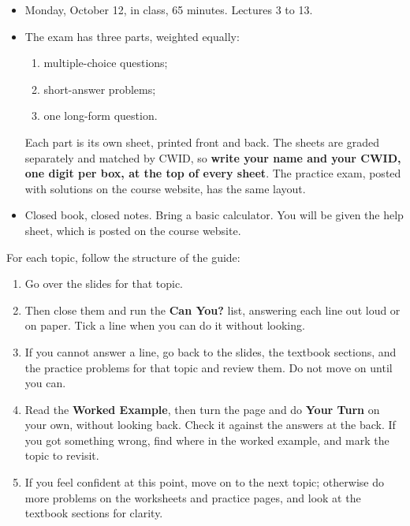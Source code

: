 \documentclass[11pt]{article}
\newcommand{\block}[1]{\needspace{4\baselineskip}\par\vspace{6pt}\noindent{\fontsize{13}{16}\selectfont\bfseries\color{accent}#1}\par\vspace{-5pt}\noindent{\color{accent}\rule{\linewidth}{0.4pt}}\par\vspace{1pt}}
\newcommand{\kw}[1]{\textbf{\textcolor{accent}{#1}}}
\begin{document}

\block{Exam Logistics}
\begin{itemize}\setlength{\itemsep}{6pt}
\item Monday, October 12, in class, 65 minutes. Lectures 3 to 13.
\item The exam has three parts, weighted equally:
\par\vspace{4pt}
\begin{enumerate}\setlength{\itemsep}{2pt}
\item multiple-choice questions;
\item short-answer problems;
\item one long-form question.
\end{enumerate}
\vspace{5pt}Each part is its own sheet, printed front and back. The sheets are graded separately and matched by CWID, so \textbf{write your name and your CWID, one digit per box, at the top of every sheet}. The practice exam, posted with solutions on the course website, has the same layout.
\item Closed book, closed notes. Bring a basic calculator. You will be given the help sheet, which is posted on the course website.
\end{itemize}

\block{How to Prepare?}
For each topic, follow the structure of the guide:
\begin{enumerate}\setlength{\itemsep}{6pt}
\item Go over the slides for that topic.
\item Then close them and run the \kw{Can You?} list, answering each line out loud or on paper. Tick a line when you can do it without looking.
\item If you cannot answer a line, go back to the slides, the textbook sections, and the practice problems for that topic and review them. Do not move on until you can.
\item Read the \kw{Worked Example}, then turn the page and do \kw{Your Turn} on your own, without looking back. Check it against the answers at the back. If you got something wrong, find where in the worked example, and mark the topic to revisit.
\item If you feel confident at this point, move on to the next topic; otherwise do more problems on the worksheets and practice pages, and look at the textbook sections for clarity.
\end{enumerate}
\end{document}
